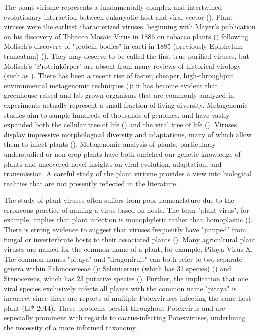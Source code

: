 \documentclass[11pt,letterpaper,titlepage]{article}
\begin{document}
\begin{linenumbers}
The plant viriome represents a fundamentally complex and intertwined evolutionary interaction between eukaryotic host and viral vector (\cite{delwart_viral_2007}). 
Plant viruses were the earliest characterized viruses, beginning with Mayer's publication on his discovery of Tobacco Mosaic Virus in 1886 on tobacco plants (\cite{mayer1886mosaikkrankheit}) following Molisch's discovery of "protein bodies" in cacti in 1885 (previously Epiphylum truncatum)  (\cite{molisch1885merkwurdige}). 
They may deserve to be called the first true purified viruses, but Molisch's "Proteinkörper" are absent from many reviews of historical virology (such as \cite{LECOQ2001929}).
There has been a recent rise of faster, cheaper, high-throughput environmental metagenomic techniques (\cite{delwart_viral_2007, lefeuvre_evolution_2019, schulz_towards_2017}): it has become evident that greenhouse-raised and lab-grown organisms that are commonly analyzed in experiments actually represent a small fraction of living diversity.  
Metagenomic studies aim to sample hundreds of thousands of genomes, and have vastly expanded both the cellular tree of life (\cite{schulz_towards_2017, hug_new_2016}) and the viral tree of life (\cite{gregory_marine_2019, lefeuvre_evolution_2019, shi_redefining_2016}).  
Viruses display impressive morphological diversity and adaptations, many of which allow them to infect plants (\cite{delwart_viral_2007, lefeuvre_evolution_2019}).
 Metagenomic analysis of plants, particularly understudied or non-crop plants have both enriched our genetic knowledge of plants and uncovered novel insights on viral evolution, adaptation, and transmission. 
 A careful study of the plant viriome provides a view into biological realities that are not presently reflected in the literature.


The study of plant viruses often suffers from poor nomenclature due to the erroneous practice of naming a virus based on hosts. 
The term "plant virus", for example, implies that plant infection is monophyletic rather than homoplastic (\cite{lefeuvre_evolution_2019}). 
There is strong evidence to suggest that viruses frequently have "jumped" from fungal or inverterbrate hosts to their associated plants (\cite{lefeuvre_evolution_2019}). 
Many agricultural plant viruses are named for the common name of a plant, for example, Pitaya Virus X. 
The common names "pitaya" and "dragonfruit" can both refer to two separate genera within Echinocereeae (\cite{le_bellec_12_2011}): Selenicereus (which has 31 species) (\cite{korotkova_phylogenetic_2017, guerrero_phylogenetic_2019}) and Stenocereus, which has 23 putative species (\cite{guerrero_phylogenetic_2019}).
Further, the implication that one viral species exclusively infects all plants with the common name "pitaya" is incorrect since there are reports of multiple Potexviruses infecting the same host plant (Li* 2014). 
These problems persist throughout Potexvirus and are especially prominent with regards to cactus-infecting Potexviruses, underlining the necessity of a more informed taxonomy.



\end{linenumbers}
\end{document}
